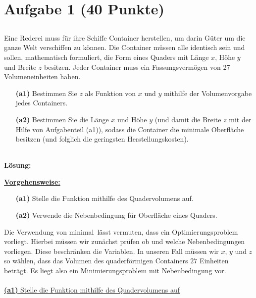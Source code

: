\vspace{1cm}
\renewcommand{\labelenumi}{\theenumi.}
\section*{Aufgabe 1 (40 Punkte)}
\vspace{0.4cm}
\subsection*{}
Eine Rederei muss für ihre Schiffe Container herstellen, um darin Güter um die ganze Welt verschiffen zu können. Die Container müssen alle identisch sein und sollen, mathematisch formuliert, die Form eines Quaders  mit Länge $ x $, Höhe $ y $ und Breite $ z $ besitzen. Jeder Container muss ein Fassungsvermögen von 27 Volumeneinheiten haben. 
\begin{enumerate}
	\item[\textbf{(a1)}]
	Bestimmen Sie $ z $ als Funktion von $ x $ und $ y $ mithilfe der Volumenvorgabe jedes Containers.
	\item[\textbf{(a2)}] 
	Bestimmen Sie die Länge $ x $ und Höhe $ y $ (und damit die Breite $ z $ mit der Hilfe von Aufgabenteil (a1)), sodass die Container die minimale Oberfläche besitzen (und folglich die geringsten Herstellungskosten).
\end{enumerate}
\ \\
\textbf{Lösung:}
\begin{mdframed}
\underline{\textbf{Vorgehensweise:}}
\renewcommand{\labelenumi}{\theenumi.}
\begin{enumerate}
\item[\textbf{(a1)}] Stelle die Funktion mithilfe des Quadervolumens auf.
\item[\textbf{(a2)}] Verwende die Nebenbedingung für Oberfläche eines Quaders.
\end{enumerate}
\end{mdframed}
Die Verwendung von \glqq minimal\grqq \ lässt vermuten, dass ein Optimierungsproblem vorliegt.
Hierbei müssen wir zunächst prüfen ob und welche Nebenbedingungen vorliegen. Diese beschränken die Variablen. In unseren Fall müssen wir $ x $,  $ y $ und $ z $ so wählen, dass das Volumen des quaderförmigen Containers $ 27 $ Einheiten beträgt.
Es liegt also ein Minimierungsproblem mit Nebenbedingung vor.\\
\\
\underline{\textbf{(a1)} Stelle die Funktion mithilfe des Quadervolumens auf }\\
